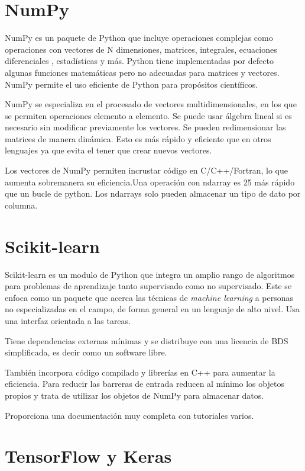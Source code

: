 \section{NumPy}\label{sect:numpy}

NumPy \cite{bressert2012scipy} es un paquete de Python que incluye operaciones complejas como operaciones con vectores de N dimensiones, matrices, integrales, ecuaciones diferenciales , estadísticas y más. Python tiene implementadas por defecto algunas funciones matemáticas pero no adecuadas para matrices y vectores. NumPy permite el uso eficiente de Python para propósitos científicos.

NumPy se especializa en el procesado de vectores multidimensionales, en los que se permiten operaciones elemento a elemento. Se puede usar álgebra lineal si es necesario sin modificar previamente los vectores. Se pueden redimensionar las matrices de manera dinámica. Esto es más rápido y eficiente que en otros lenguajes ya que evita el tener que crear nuevos vectores. 

Los vectores de NumPy permiten incrustar código en C/C++/Fortran, lo que aumenta sobremanera su eficiencia.Una operación con ndarray es 25 más rápido que un bucle de python. Los ndarrays solo pueden almacenar un tipo de dato por columna. 
 
\section{Scikit-learn}\label{sect:scikit}

Scikit-learn es un modulo de Python que integra un amplio rango de algoritmos para problemas de aprendizaje tanto supervisado como no supervisado. Este se enfoca como un paquete que acerca las técnicas de \textit{machine learning} a personas no especializadas en el campo, de forma general en un lenguaje de alto nivel.  Usa una interfaz orientada a las tareas.

Tiene dependencias externas mínimas y se distribuye  con una licencia de BDS simplificada, es decir como un software libre.

También incorpora código compilado y librerías en C++ para aumentar la eficiencia. Para reducir las barreras de entrada reducen al mínimo los objetos propios y trata de utilizar los objetos de NumPy para almacenar datos.

Proporciona una documentación muy completa con tutoriales varios.

\section{TensorFlow y Keras}

